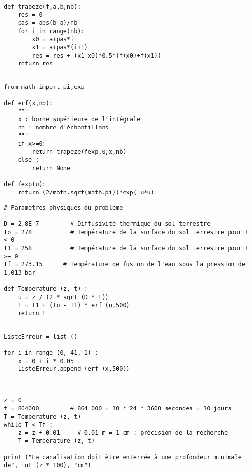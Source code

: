 \question{} 
\begin{lstlisting}

def trapeze(f,a,b,nb):
    res = 0
    pas = abs(b-a)/nb
    for i in range(nb):
        x0 = a+pas*i
        x1 = a+pas*(i+1)
        res = res + (x1-x0)*0.5*(f(x0)+f(x1))
    return res

\end{lstlisting}

\question{} 

\begin{lstlisting}

from math import pi,exp

def erf(x,nb):
    """
    x : borne supérieure de l'intégrale
    nb : nombre d'échantillons
    """
    if x>=0:
        return trapeze(fexp,0,x,nb)
    else :
        return None

def fexp(u):
    return (2/math.sqrt(math.pi))*exp(-u*u)

\end{lstlisting}

\question{}

\begin{lstlisting}
# Paramètres physiques du problème

D = 2.8E-7         # Diffusivité thermique du sol terrestre
To = 278           # Température de la surface du sol terrestre pour t < 0
T1 = 258           # Température de la surface du sol terrestre pour t >= 0
Tf = 273.15      # Température de fusion de l'eau sous la pression de 1,013 bar

def Temperature (z, t) :
    u = z / (2 * sqrt (D * t))
    T = T1 + (To - T1) * erf (u,500)
    return T
\end{lstlisting}

\question{} 

\begin{lstlisting}

ListeErreur = list ()

for i in range (0, 41, 1) :
    x = 0 + i * 0.05
    ListeErreur.append (erf (x,500))


\end{lstlisting}

\question{}

\begin{lstlisting}

z = 0
t = 864000         # 864 000 = 10 * 24 * 3600 secondes = 10 jours
T = Temperature (z, t)
while T < Tf :
    z = z + 0.01     # 0.01 m = 1 cm : précision de la recherche
    T = Temperature (z, t)
    
print ("La canalisation doit être enterrée à une profondeur minimale de", int (z * 100), "cm")

\end{lstlisting}
